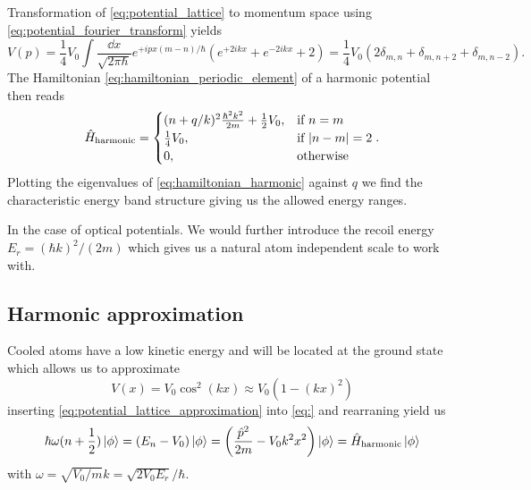 Transformation of \cref{eq:potential_lattice} to momentum space
using \cref{eq:potential_fourier_transform} yields
\begin{equation*}
  V(p)
  =
  \frac{1}{4}V_0
  \int\frac{\dd{x}}{\sqrt{2\pi\hbar}}
  e^{+ipx(m-n)/\hbar}\left(e^{+2ikx}+e^{-2ikx}+2\right)
  =
  \frac{1}{4}V_0\left(2\delta_{m,n}+\delta_{m,n+2}+\delta_{m,n-2}\right).
\end{equation*}
The Hamiltonian \cref{eq:hamiltonian_periodic_element} of a
harmonic potential then reads
\begin{equation}
  \hat{H}_\text{harmonic}
  =\begin{cases}
    (n+q/k)^2\frac{\hbar^2k^2}{2m}+\frac{1}{2}V_0, & \text{if } n=m\\
    \frac{1}{4}V_0, & \text{if } \abs{n-m}=2\\
    0, & \text{otherwise}
  \end{cases}
  \label{eq:harmonic_hamiltonian}.
\end{equation}
Plotting the eigenvalues of \cref{eq:hamiltonian_harmonic} against
$q$ we find the characteristic energy band structure giving us the allowed
energy ranges.

In the case of optical potentials. We would further introduce the recoil
energy $E_r=(\hbar k)^2/(2m)$ which gives us a natural atom independent scale
to work with.

\subsection{Harmonic approximation}

Cooled atoms have a low kinetic energy and will be located at the ground
state which allows us to approximate
\begin{equation}
  V(x)
  =V_0\cos^2(kx)
  \approx V_0\left(1-(kx)^2\right)
  \label{eq:potential_lattice_approximation}
\end{equation}
inserting \cref{eq:potential_lattice_approximation} into
\cref{eq:} and rearraning yield us
\begin{equation}
  \hbar\omega(n+\frac{1}{2})\ket{\phi}
  =(E_n-V_0)\ket{\phi}
  =\left(\frac{\hat{p}^2}{2m}-V_0k^2x^2\right)\ket{\phi}
  =\hat{H}_\text{harmonic}\ket{\phi}
\end{equation}
with $\omega=\sqrt{V_0/m}k=\sqrt{2V_0E_r}/\hbar$.
